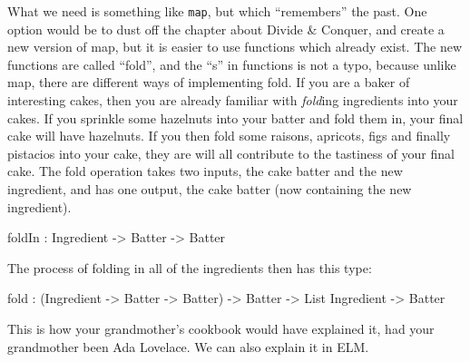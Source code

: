 \documentclass[12pt]{amsbook}
\begin{document}
What we need is something like \texttt{map}, but which ``remembers'' the past.
One option would be to dust off the chapter about Divide \& Conquer, 
and create a new version of map, but it is easier to use functions which already exist.
The new functions are called ``fold'', 
and the ``s'' in functions is not a typo,
because unlike map, there are different ways of implementing fold.
If you are a baker of interesting cakes, 
then you are already familiar with \emph{fold}ing ingredients into your cakes.
If you sprinkle some hazelnuts into your batter and fold them in,
your final cake will have hazelnuts.
If you then fold some raisons, apricots, figs and finally pistacios into your cake, they are will all contribute to the tastiness of your final cake.
The fold operation takes two inputs, the cake batter and the new ingredient, and has one output, the cake batter (now containing the new ingredient).
\begin{code}
foldIn : Ingredient -> Batter -> Batter
\end{code}
The process of folding in all of the ingredients then has this type:
\begin{code}
fold : (Ingredient -> Batter -> Batter) -> Batter -> List Ingredient -> Batter
\end{code}
This is how your grandmother's cookbook would have explained it, 
had your grandmother been Ada Lovelace.
We can also explain it in ELM.
\end{document}
